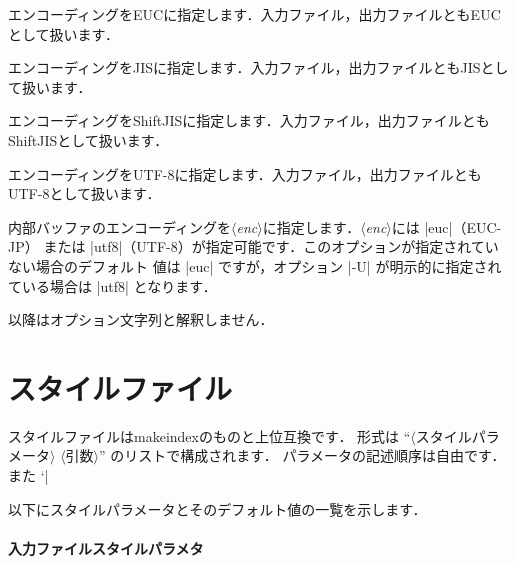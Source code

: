 \documentclass[a4paper]{jsarticle}
\newcommand{\SoftName}[1]{\textsf{#1}}
\newcommand{\Meta}[1]{$\langle$\mbox{}\textit{#1}\mbox{}$\rangle$}
\newcommand{\jMeta}[1]{$\langle$\mbox{}\textsf{#1}\mbox{}$\rangle$}
\begin{document}
\begin{description}[leftmargin=2cm]
\item[|-E|]
エンコーディングをEUCに指定します．入力ファイル，出力ファイルともEUCとして扱います．

\item[|-J|]
エンコーディングをJISに指定します．入力ファイル，出力ファイルともJISとして扱います．

\item[|-S|]
エンコーディングをShiftJISに指定します．入力ファイル，出力ファイルともShiftJISとして扱います．

\item[|-U|]
エンコーディングをUTF-8に指定します．入力ファイル，出力ファイルともUTF-8として扱います．

\item[|-I| \Meta{enc}]
内部バッファのエンコーディングを\Meta{enc}に指定します．\Meta{enc}には |euc|（EUC-JP）
または |utf8|（UTF-8）が指定可能です．このオプションが指定されていない場合のデフォルト
値は |euc| ですが，オプション |-U| が明示的に指定されている場合は |utf8| となります．

\item[|--|]
以降はオプション文字列と解釈しません．
\end{description}

\section{スタイルファイル}

スタイルファイルは\SoftName{makeindex}のものと上位互換です．
形式は ``\jMeta{スタイルパラメータ} \jMeta{引数}'' のリストで構成されます．
パラメータの記述順序は自由です．また `|%

以下にスタイルパラメータとそのデフォルト値の一覧を示します．

\paragraph{入力ファイルスタイルパラメタ}
\end{document}

